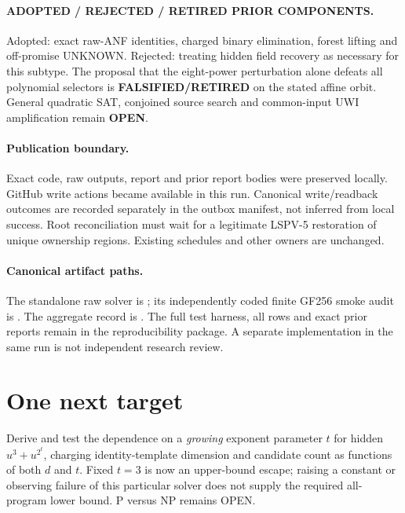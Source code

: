 \documentclass[11pt]{article}
\begin{document}
\paragraph{ADOPTED / REJECTED / RETIRED PRIOR COMPONENTS.}
Adopted: exact raw-ANF identities, charged binary elimination, forest lifting
and off-promise UNKNOWN. Rejected: treating hidden field recovery as necessary
for this subtype. The proposal that the eight-power perturbation alone defeats
all polynomial selectors is \textbf{FALSIFIED/RETIRED} on the stated affine
orbit. General quadratic SAT, conjoined source search and common-input UWI
amplification remain \textbf{OPEN}.

\paragraph{Publication boundary.}
Exact code, raw outputs, report and prior report bodies were preserved locally.
GitHub write actions became available in this run. Canonical write/readback
outcomes are recorded separately in the outbox manifest, not inferred from
local success. Root reconciliation must wait for a legitimate LSPV-5 restoration
of unique ownership regions. Existing schedules and other owners are unchanged.

\paragraph{Canonical artifact paths.}
The standalone raw solver is
; its independently coded finite
GF256 smoke audit is .
The aggregate record is
.
The full test harness, all rows and exact prior reports remain in the
reproducibility package. A separate implementation in the same run is not
independent research review.

\section{One next target}
Derive and test the dependence on a \emph{growing} exponent parameter $t$ for
hidden $u^3+u^{2^t}$, charging identity-template dimension and candidate count
as functions of both $d$ and $t$. Fixed $t=3$ is now an upper-bound escape;
raising a constant or observing failure of this particular solver does not
supply the required all-program lower bound. P versus NP remains OPEN.
\end{document}
